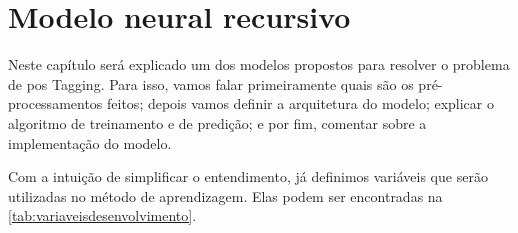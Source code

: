 \chapter{Modelo neural recursivo}\label{modeloneuralrecursivo}

Neste capítulo será explicado um dos modelos propostos para resolver o problema de \ac{pos} Tagging. Para isso, vamos falar primeiramente quais são os pré-processamentos feitos; depois vamos definir a arquitetura do modelo; explicar o algoritmo de treinamento e de predição; e por fim, comentar sobre a implementação do modelo.

Com a intuição de simplificar o entendimento, já definimos variáveis que serão utilizadas no método de aprendizagem. Elas podem ser encontradas na \autoref{tab:variaveisdesenvolvimento}.
